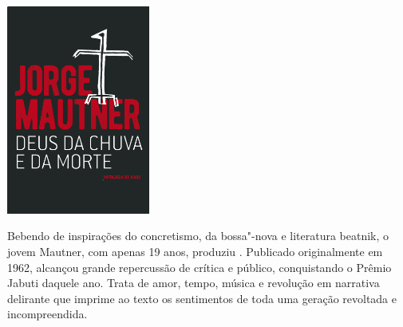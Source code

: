 \hspace{.5cm}

\begin{center}
\hspace*{-.5cm}\includegraphics[width=47mm]{./imgs/mautner.jpg}
\end{center}

\hspace*{-7cm}\hrulefill\hspace*{-7cm}

\medskip

\noindent{}Bebendo de inspirações do concretismo, da bossa"-nova e literatura beatnik, o jovem Mautner, com apenas 19 anos, produziu {}. Publicado originalmente em 1962, alcançou grande repercussão de crítica e público, conquistando o Prêmio Jabuti daquele ano. Trata de amor, tempo, música e revolução em narrativa delirante que imprime ao texto os sentimentos de toda uma geração revoltada e incompreendida.

\vfill

\hspace*{-.4cm}\begin{minipage}[c]{1\linewidth}
\small{
{}}
\end{minipage}

\pagebreak

\hspace{.5cm}

